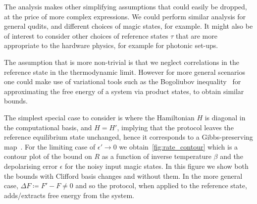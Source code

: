 \documentclass[pra,
aps,
twocolumn,
superscriptaddress,
groupedaddress,
nofootinbib,
reprint
]{revtex4-1}
\begin{document}
The analysis makes other simplifying assumptions that could easily be dropped, at the price of more complex expressions. We could perform similar analysis for general qudits, and different choices of magic states, for example. It might also be of interest to consider other choices of reference states $\tau$ that are more appropriate to the hardware physics, for example for photonic set-ups.

The assumption that is more non-trivial is that we neglect correlations in the reference state in the thermodynamic limit. However for more general scenarios one could make use of variational tools such as the Bogoliubov inequality~\cite{bogolyubov_1966} for approximating the free energy of a system via product states, to obtain similar bounds.




The simplest special case to consider is where the Hamiltonian $H$ is diagonal in the computational basis, and $H=H'$, implying that the protocol leaves the reference equilibrium state unchanged, hence it corresponds to a Gibbs-preserving map~\cite{faist_2015}. For the limiting case of $\epsilon' \rightarrow 0$ we obtain~\cref{fig:rate_contour} which is a contour plot of the bound on $R$ as a function of inverse temperature $\beta$ and the depolarising error $\epsilon$ for the noisy input magic states. In this figure we show both the bounds with Clifford basis changes and without them. In the more general case, $\Delta F \coloneqq F' - F \ne 0$ and so the protocol, when applied to the reference state, adds/extracts free energy from the system. 


%


\end{document}
